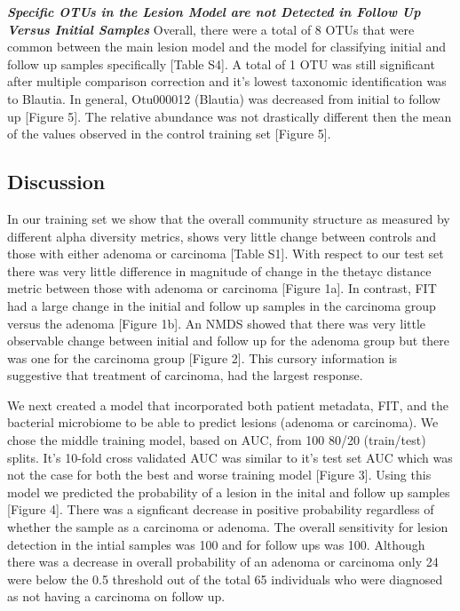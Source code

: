 \documentclass[12pt,]{article}
\begin{document}
\textbf{\emph{Specific OTUs in the Lesion Model are not Detected in
Follow Up Versus Initial Samples}} Overall, there were a total of 8 OTUs
that were common between the main lesion model and the model for
classifying initial and follow up samples specifically {[}Table S4{]}. A
total of 1 OTU was still significant after multiple comparison
correction and it's lowest taxonomic identification was to Blautia. In
general, Otu000012 (Blautia) was decreased from initial to follow up
{[}Figure 5{]}. The relative abundance was not drastically different
then the mean of the values observed in the control training set
{[}Figure 5{]}.

\newpage

\subsection{Discussion}\label{discussion}

In our training set we show that the overall community structure as
measured by different alpha diversity metrics, shows very little change
between controls and those with either adenoma or carcinoma {[}Table
S1{]}. With respect to our test set there was very little difference in
magnitude of change in the thetayc distance metric between those with
adenoma or carcinoma {[}Figure 1a{]}. In contrast, FIT had a large
change in the initial and follow up samples in the carcinoma group
versus the adenoma {[}Figure 1b{]}. An NMDS showed that there was very
little observable change between initial and follow up for the adenoma
group but there was one for the carcinoma group {[}Figure 2{]}. This
cursory information is suggestive that treatment of carcinoma, had the
largest response.

We next created a model that incorporated both patient metadata, FIT,
and the bacterial microbiome to be able to predict lesions (adenoma or
carcinoma). We chose the middle training model, based on AUC, from 100
80/20 (train/test) splits. It's 10-fold cross validated AUC was similar
to it's test set AUC which was not the case for both the best and worse
training model {[}Figure 3{]}. Using this model we predicted the
probability of a lesion in the inital and follow up samples {[}Figure
4{]}. There was a signficant decrease in positive probability regardless
of whether the sample as a carcinoma or adenoma. The overall sensitivity
for lesion detection in the intial samples was 100 and for follow ups
was 100. Although there was a decrease in overall probability of an
adenoma or carcinoma only 24 were below the 0.5 threshold out of the
total 65 individuals who were diagnosed as not having a carcinoma on
follow up.
\end{document}
